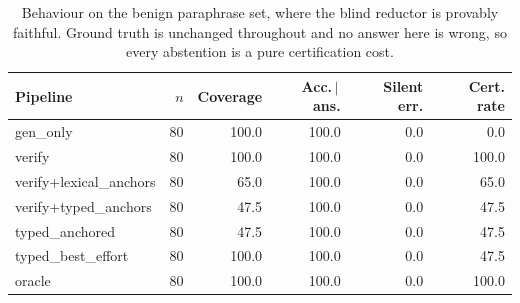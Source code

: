 \begin{table}[t]
\centering
\caption{Behaviour on the benign paraphrase set, where the blind reductor is provably faithful. Ground truth is unchanged throughout and no answer here is wrong, so every abstention is a pure certification cost.}
\label{tab:benign}
\small
\begin{tabular}{lrrrrr}
\toprule
Pipeline & $n$ & Coverage & Acc.\,$\mid$\,ans. & Silent err. & Cert. rate \\
\midrule
gen\_only & 80 & 100.0 & 100.0 & 0.0 & 0.0 \\
verify & 80 & 100.0 & 100.0 & 0.0 & 100.0 \\
verify+lexical\_anchors & 80 & 65.0 & 100.0 & 0.0 & 65.0 \\
verify+typed\_anchors & 80 & 47.5 & 100.0 & 0.0 & 47.5 \\
typed\_anchored & 80 & 47.5 & 100.0 & 0.0 & 47.5 \\
typed\_best\_effort & 80 & 100.0 & 100.0 & 0.0 & 47.5 \\
oracle & 80 & 100.0 & 100.0 & 0.0 & 100.0 \\
\bottomrule
\end{tabular}
\end{table}
